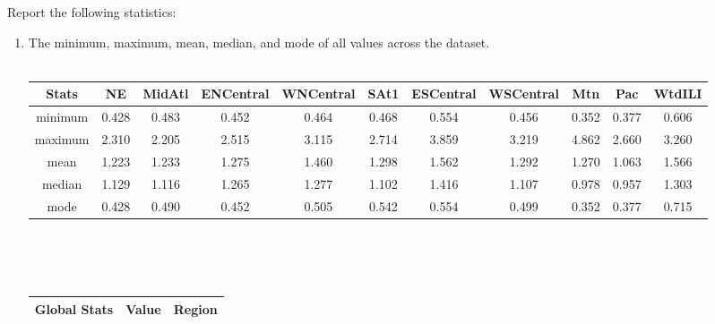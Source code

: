 \documentclass{article}
\def\blu#1{{\color{blu}#1}}
\def\ans#1{{\color{ans}#1}}
\def\enum#1{\begin{enumerate}#1\end{enumerate}}
\begin{document}
\blu{Report the following statistics}:
\enum{
\item The minimum, maximum, mean, median, and mode of all values across the dataset.\\ \\
%
%
\ans{
    \scriptsize
    \setlength{\tabcolsep}{2pt}
    \begin{tabular}{SSSSSSSSSSS} \toprule
        {Stats} & {NE} & {MidAtl} & {ENCentral} & {WNCentral} & {SAt1} & {ESCentral} & {WSCentral} & {Mtn} & {Pac} & {WtdILI} \\ \midrule
        {minimum} & 0.428 & 0.483 & 0.452 & 0.464 & 0.468 & 0.554 & 0.456 & 0.352 & 0.377 & 0.606 \\
        {maximum} & 2.310 & 2.205 & 2.515 & 3.115 & 2.714 & 3.859 & 3.219 & 4.862 & 2.660 & 3.260 \\
        {mean} & 1.223 & 1.233 & 1.275 & 1.460 & 1.298 & 1.562 & 1.292 & 1.270 & 1.063 & 1.566 \\
        {median} & 1.129 & 1.116 & 1.265 & 1.277 & 1.102 & 1.416 & 1.107 & 0.978 & 0.957 & 1.303 \\
        {mode} & 0.428 & 0.490 & 0.452 & 0.505 & 0.542 & 0.554 & 0.499 & 0.352 & 0.377 & 0.715 \\ \bottomrule
    \end{tabular}
    \\ \\ \\
    \begin{tabular}{SSS} \toprule
        {Global Stats} & {Value} & {Region} \\ \midrule

\end{tabular}}}
\end{document}
